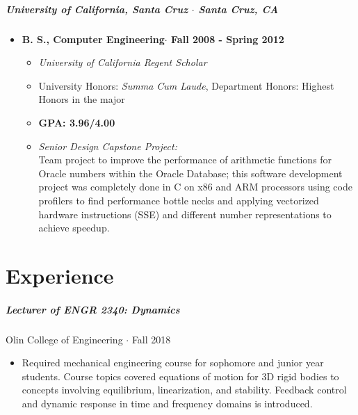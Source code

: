 \documentclass[10pt,letterpaper]{article}
\begin{document}
\subparagraph{University of California, Santa Cruz $\cdot$ Santa Cruz, CA }
\begin{itemize}
    \item {\bf B. S., Computer Engineering$\cdot$ Fall 2008 - Spring 2012}
    \begin{itemize}
		\item {\em University of California Regent Scholar} 
		\item University Honors: {\em Summa Cum Laude}, Department Honors: Highest Honors in the major
        \item {\bf GPA: 3.96/4.00 }

        \item {\em Senior Design Capstone Project:}\\
        Team project to improve the performance of arithmetic functions for Oracle numbers within the Oracle Database; this software development project was completely done in C on x86 and ARM processors using code profilers to find performance bottle necks and applying vectorized hardware instructions (SSE) and different number representations to achieve speedup. 
    \end{itemize}
\end{itemize}





\iffalse


\nocite{andersICRA18}
\nocite{anders2018juggle}
\nocite{acmp2017}
\nocite{mems17}
\nocite{isec17}
\nocite{ijrr17}
\nocite{apl16}
\nocite{eaai17}
\nocite{rss15}
\nocite{dental}

\fi

\section*{Experience}
\subparagraph{Lecturer of ENGR 2340: Dynamics}
Olin College of Engineering $\cdot$ Fall 2018
\begin{itemize}
\item Required mechanical engineering course for sophomore and junior year students.  Course topics covered equations of motion for 3D rigid bodies to concepts involving equilibrium, linearization, and stability. Feedback control and dynamic response in time and frequency domains is introduced.
\end{itemize}
\end{document}
